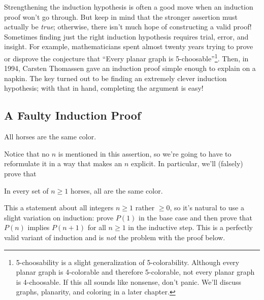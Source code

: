 Strengthening the induction hypothesis is often a good move when an
induction proof won't go through.  But keep in mind that the stronger
assertion must actually be \textit{true}; otherwise, there isn't much hope
of constructing a valid proof!  Sometimes finding just the right induction
hypothesis requires trial, error, and insight.  For example,
mathematicians spent almost twenty years trying to prove or disprove the
conjecture that ``Every planar graph is
5-choosable''\footnote{5-choosability is a slight generalization of
  5-colorability.  Although every planar graph is 4-colorable and
  therefore 5-colorable, not every planar graph is 4-choosable.  If this
  all sounds like nonsense, don't panic.  We'll discuss graphs, planarity,
  and coloring in a later chapter.}.  Then, in 1994, Carsten Thomassen
gave an induction proof simple enough to explain on a napkin.  The key
turned out to be finding an extremely clever induction hypothesis; with
that in hand, completing the argument is easy!


\subsection{A Faulty Induction Proof}

\begin{falsethm*}
All horses are the same color.
\end{falsethm*}

Notice that no $n$ is mentioned in this assertion, so we're going to have
to reformulate it in a way that makes an $n$ explicit.  In particular,
we'll (falsely) prove that

\begin{falsethm}\label{horses}
In every set of $n \geq 1$ horses, all are the same color.
\end{falsethm}

This a statement about all integers $n \geq 1$ rather $\geq 0$, so it's
natural to use a slight variation on induction: prove $P(1)$ in the base
case and then prove that $P(n)$ implies $P(n+1)$ for all $n \geq 1$ in the
inductive step.  This is a perfectly valid variant of induction and is
{\em not} the problem with the proof below.

